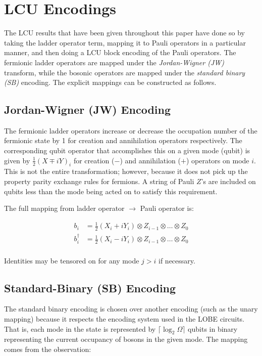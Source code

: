 \section{LCU Encodings}
\label{sec:lcu-encodings}

The LCU results that have been given throughout this paper have done so by taking the ladder operator term, mapping it to Pauli operators in a particular manner, and then doing a LCU block encoding of the Pauli operators. 
The fermionic ladder operators are mapped under the \textit{Jordan-Wigner (JW)} \cite{jordan-wigner} transform, while the bosonic operators are mapped under the \textit{standard binary (SB)} \cite{Sawaya_2020, McArdle_2019}encoding.
The explicit mappings can be constructed as follows. 

\subsection{Jordan-Wigner (JW) Encoding}
\label{subsec:jordan-wigner}
The fermionic ladder operators increase or decrease the occupation number of the fermionic state by 1 for creation and annihilation operators respectively. 
The corresponding qubit operator that accomplishes this on a given mode (qubit) is given by $\frac12 \left(X \mp iY \right)_i$ for creation ($-$) and annihilation ($+$) operators on mode $i$. 
This is not the entire transformation; however, because it does not pick up the property parity exchange rules for fermions.
A string of Pauli $Z$'s are included on qubits less than the mode being acted on to satisfy this requirement.

The full mapping from ladder operator $\rightarrow$ Pauli operator is:

\begin{align}
    b_i &= \frac12 \left(X_i + iY_i\right) \otimes Z_{i - 1} \otimes \dots \otimes Z_0 \\ \nonumber
    b_i^\dagger &= \frac12 \left(X_i - iY_i\right) \otimes Z_{i - 1} \otimes \dots \otimes Z_0\\
\end{align}

Identities may be tensored on for any mode $j > i$ if necessary.


\subsection{Standard-Binary (SB) Encoding}
\label{subsec:standard-binary}

The standard binary encoding is chosen over another encoding (such as the unary mapping) because it respects the encoding system used in the LOBE circuits.
That is, each mode in the state is represented by $\lceil \log_2{\Omega} \rceil$ qubits in binary representing the current occupancy of bosons in the given mode. 
The mapping comes from the observation:

